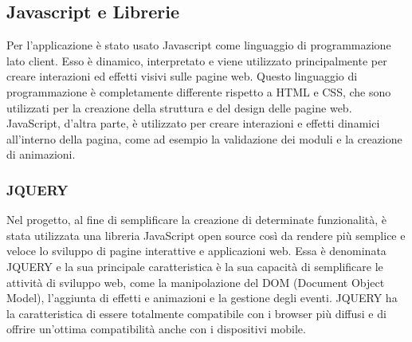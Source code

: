 \documentclass[a4paper,final,12pt]{report}
\begin{document}
\subsection{Javascript e Librerie}
Per l'applicazione è stato usato Javascript come linguaggio di programmazione lato client. Esso è dinamico, interpretato e viene utilizzato principalmente per creare interazioni ed effetti visivi sulle pagine web. Questo linguaggio di programmazione è completamente differente rispetto a HTML e CSS, che sono utilizzati per la creazione della struttura e del design delle pagine web. JavaScript, d'altra parte, è utilizzato per creare interazioni e effetti dinamici all'interno della pagina, come ad esempio la validazione dei moduli e la creazione di animazioni.
\subsubsection{JQUERY}
Nel progetto, al fine di semplificare la creazione di determinate funzionalità, è stata utilizzata una libreria JavaScript open source così da rendere più semplice e veloce lo sviluppo di pagine interattive e applicazioni web. Essa è denominata JQUERY \cite{JQUERY} e la sua principale caratteristica è la sua capacità di semplificare le attività di sviluppo web, come la manipolazione del DOM (Document Object Model), l'aggiunta di effetti e animazioni e la gestione degli eventi. JQUERY ha la caratteristica di essere totalmente compatibile con i browser più diffusi e di offrire un'ottima compatibilità anche con i dispositivi mobile.
\end{document}
